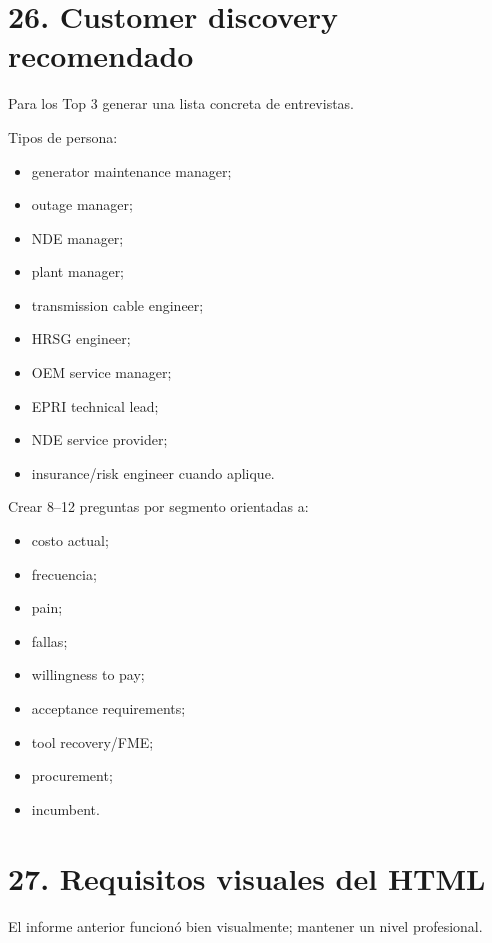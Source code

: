 \documentclass[11pt,a4paper]{article}
\begin{document}
\section*{26. Customer discovery recomendado}
Para los Top 3 generar una lista concreta de entrevistas.

Tipos de persona:

\begin{itemize}
\item generator maintenance manager;
\item outage manager;
\item NDE manager;
\item plant manager;
\item transmission cable engineer;
\item HRSG engineer;
\item OEM service manager;
\item EPRI technical lead;
\item NDE service provider;
\item insurance/risk engineer cuando aplique.
\end{itemize}

Crear 8–12 preguntas por segmento orientadas a:

\begin{itemize}
\item costo actual;
\item frecuencia;
\item pain;
\item fallas;
\item willingness to pay;
\item acceptance requirements;
\item tool recovery/FME;
\item procurement;
\item incumbent.
\end{itemize}


\section*{27. Requisitos visuales del HTML}
El informe anterior funcionó bien visualmente; mantener un nivel profesional.
\end{document}
